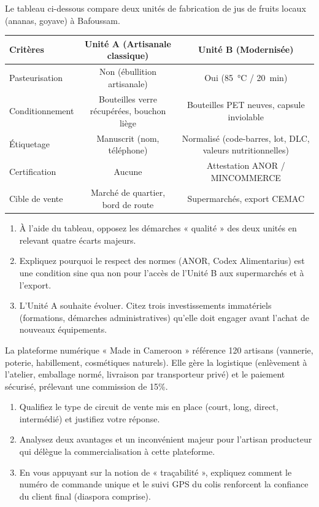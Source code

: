 \documentclass[11pt]{article}
\begin{document}
\begin{exercice}
Le tableau ci-dessous compare deux unités de fabrication de jus de fruits locaux (ananas, goyave) à Bafoussam.

\begin{tabularx}{\linewidth}{>{\raggedright\arraybackslash}Xcc}
\toprule
\textbf{Critères} & \textbf{Unité A (Artisanale classique)} & \textbf{Unité B (Modernisée)} \\
\midrule
Pasteurisation & Non (ébullition artisanale) & Oui (\SI{85}{\celsius} / \SI{20}{\minute}) \\
Conditionnement & Bouteilles verre récupérées, bouchon liège & Bouteilles PET neuves, capsule inviolable \\
Étiquetage & Manuscrit (nom, téléphone) & Normalisé (code-barres, lot, DLC, valeurs nutritionnelles) \\
Certification & Aucune & Attestation ANOR / MINCOMMERCE \\
Cible de vente & Marché de quartier, bord de route & Supermarchés, export CEMAC \\
\bottomrule
\end{tabularx}

\begin{enumerate}
    \item À l'aide du tableau, opposez les démarches « qualité » des deux unités en relevant quatre écarts majeurs.
    \item Expliquez pourquoi le respect des normes (ANOR, Codex Alimentarius) est une condition \og sine qua non \fg{} pour l'accès de l'Unité B aux supermarchés et à l'export.
    \item L'Unité A souhaite évoluer. Citez trois investissements immatériels (formations, démarches administratives) qu'elle doit engager avant l'achat de nouveaux équipements.
\end{enumerate}
\end{exercice}

\begin{exercice}
La plateforme numérique « Made in Cameroon » référence 120 artisans (vannerie, poterie, habillement, cosmétiques naturels). Elle gère la logistique (enlèvement à l'atelier, emballage normé, livraison par transporteur privé) et le paiement sécurisé, prélevant une commission de 15\%.
\begin{enumerate}
    \item Qualifiez le type de circuit de vente mis en place (court, long, direct, intermédié) et justifiez votre réponse.
    \item Analysez deux avantages et un inconvénient majeur pour l'artisan producteur qui délègue la commercialisation à cette plateforme.
    \item En vous appuyant sur la notion de « traçabilité », expliquez comment le numéro de commande unique et le suivi GPS du colis renforcent la confiance du client final (diaspora comprise).
\end{enumerate}
\end{exercice}
\end{document}
